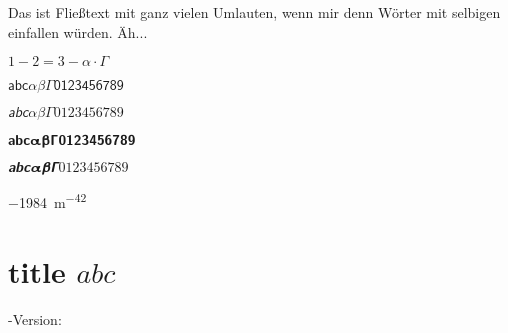 \documentclass[english,ngerman]%
{tudscrreprt}
\begin{document}
Das ist Fließtext mit ganz vielen Umlauten, wenn mir denn Wörter mit selbigen 
einfallen würden. Äh...

$1-2=3 - \alpha \cdot \Gamma$

$\mathsfup{abc \alpha\beta\Gamma 0123456789}$

$\mathsfit{abc \alpha\beta\Gamma 0123456789}$

$\mathbfsfup{abc \alpha\beta\Gamma 0123456789}$

$\mathbfsfit{abc \alpha\beta\Gamma 0123456789}$

\SI{-1984}{m^{-42}}

\section{title $abc$}

\makeatletter
\meaning\mv@normal

\meaning\mv@univers

\meaning\mv@dinbold

\LaTeXe-Version: \fmtversion
\end{document}
